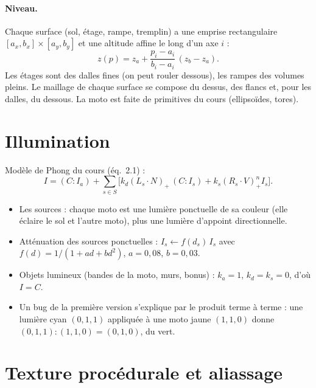 \documentclass[11pt,a4paper]{article}
\newcommand{\pos}[1]{\left(#1\right)_+}
\begin{document}
\paragraph{Niveau.} Chaque surface (sol, étage, rampe, tremplin) a une emprise rectangulaire $[a_x, b_x]\times[a_y, b_y]$ et une altitude affine le long d'un axe $i$ :
\[
	z(p) = z_a + \frac{p_i - a_i}{b_i - a_i}\,(z_b - z_a).
\]
Les étages sont des dalles fines (on peut rouler dessous), les rampes des volumes pleins. Le maillage de chaque surface se compose du dessus, des flancs et, pour les dalles, du dessous. La moto est faite de primitives du cours (ellipsoïdes, tores).

\section{Illumination}

Modèle de Phong du cours (éq.~2.1) :
\[
	I = (C : I_a) + \sum_{s\in S} \Big[ k_d \pos{L_s\cdot N}\,(C : I_s) + k_s \pos{R_s\cdot V}^{n} I_s \Big].
\]
\begin{itemize}
	\item Les sources : chaque moto est une lumière ponctuelle de sa couleur (elle éclaire le sol et l'autre moto), plus une lumière d'appoint directionnelle.
	\item Atténuation des sources ponctuelles : $I_s \leftarrow f(d_s)\, I_s$ avec $f(d) = 1/(1 + a d + b d^2)$, $a = 0{,}08$, $b = 0{,}03$.
	\item Objets lumineux (bandes de la moto, murs, bonus) : $k_a = 1$, $k_d = k_s = 0$, d'où $I = C$.
	\item Un bug de la première version s'explique par le produit terme à terme : une lumière cyan $(0,1,1)$ appliquée à une moto jaune $(1,1,0)$ donne $(0,1,1):(1,1,0) = (0,1,0)$, du vert.
\end{itemize}

\section{Texture procédurale et aliassage}
\end{document}
